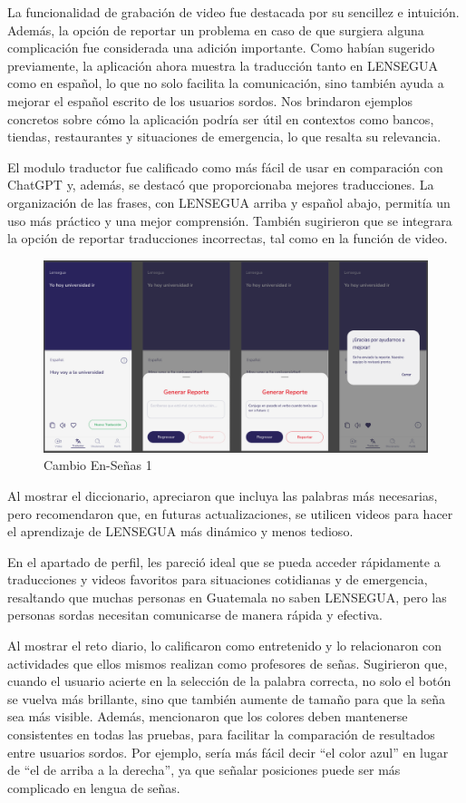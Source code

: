 La funcionalidad de grabación de video fue destacada por su sencillez e intuición. Además, la opción de reportar un problema en caso de que surgiera alguna complicación fue considerada una adición importante. Como habían sugerido previamente, la aplicación ahora muestra la traducción tanto en LENSEGUA como en español, lo que no solo facilita la comunicación, sino también ayuda a mejorar el español escrito de los usuarios sordos. Nos brindaron ejemplos concretos sobre cómo la aplicación podría ser útil en contextos como bancos, tiendas, restaurantes y situaciones de emergencia, lo que resalta su relevancia. 

El modulo traductor fue calificado como más fácil de usar en comparación con ChatGPT y, además, se destacó que proporcionaba mejores traducciones. La organización de las frases, con LENSEGUA arriba y español abajo, permitía un uso más práctico y una mejor comprensión. También sugirieron que se integrara la opción de reportar traducciones incorrectas, tal como en la función de video. 


\begin{figure} [H]
    \centering
    \includegraphics[width=0.9\linewidth]{figuras/cambio1.png}
    \caption{Cambio En-Señas 1}
    \label{fig:enter-label}
\end{figure}


Al mostrar el diccionario, apreciaron que incluya las palabras más necesarias, pero recomendaron que, en futuras actualizaciones, se utilicen videos para hacer el aprendizaje de LENSEGUA más dinámico y menos tedioso.

En el apartado de perfil, les pareció ideal que se pueda acceder rápidamente a traducciones y videos favoritos para situaciones cotidianas y de emergencia, resaltando que muchas personas en Guatemala no saben LENSEGUA, pero las personas sordas necesitan comunicarse de manera rápida y efectiva.

Al mostrar el reto diario, lo calificaron como entretenido y lo relacionaron con actividades que ellos mismos realizan como profesores de señas. Sugirieron que, cuando el usuario acierte en la selección de la palabra correcta, no solo el botón se vuelva más brillante, sino que también aumente de tamaño para que la seña sea más visible. Además, mencionaron que los colores deben mantenerse consistentes en todas las pruebas, para facilitar la comparación de resultados entre usuarios sordos. Por ejemplo, sería más fácil decir ``el color azul'' en lugar de ``el de arriba a la derecha'', ya que señalar posiciones puede ser más complicado en lengua de señas.

